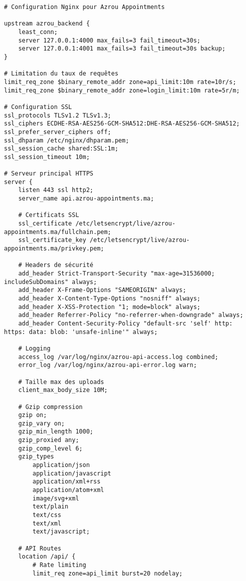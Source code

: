 \begin{lstlisting}[caption=nginx.conf - Configuration Nginx complète]
# Configuration Nginx pour Azrou Appointments

upstream azrou_backend {
    least_conn;
    server 127.0.0.1:4000 max_fails=3 fail_timeout=30s;
    server 127.0.0.1:4001 max_fails=3 fail_timeout=30s backup;
}

# Limitation du taux de requêtes
limit_req_zone $binary_remote_addr zone=api_limit:10m rate=10r/s;
limit_req_zone $binary_remote_addr zone=login_limit:10m rate=5r/m;

# Configuration SSL
ssl_protocols TLSv1.2 TLSv1.3;
ssl_ciphers ECDHE-RSA-AES256-GCM-SHA512:DHE-RSA-AES256-GCM-SHA512;
ssl_prefer_server_ciphers off;
ssl_dhparam /etc/nginx/dhparam.pem;
ssl_session_cache shared:SSL:1m;
ssl_session_timeout 10m;

# Serveur principal HTTPS
server {
    listen 443 ssl http2;
    server_name api.azrou-appointments.ma;
    
    # Certificats SSL
    ssl_certificate /etc/letsencrypt/live/azrou-appointments.ma/fullchain.pem;
    ssl_certificate_key /etc/letsencrypt/live/azrou-appointments.ma/privkey.pem;
    
    # Headers de sécurité
    add_header Strict-Transport-Security "max-age=31536000; includeSubDomains" always;
    add_header X-Frame-Options "SAMEORIGIN" always;
    add_header X-Content-Type-Options "nosniff" always;
    add_header X-XSS-Protection "1; mode=block" always;
    add_header Referrer-Policy "no-referrer-when-downgrade" always;
    add_header Content-Security-Policy "default-src 'self' http: https: data: blob: 'unsafe-inline'" always;
    
    # Logging
    access_log /var/log/nginx/azrou-api-access.log combined;
    error_log /var/log/nginx/azrou-api-error.log warn;
    
    # Taille max des uploads
    client_max_body_size 10M;
    
    # Gzip compression
    gzip on;
    gzip_vary on;
    gzip_min_length 1000;
    gzip_proxied any;
    gzip_comp_level 6;
    gzip_types
        application/json
        application/javascript
        application/xml+rss
        application/atom+xml
        image/svg+xml
        text/plain
        text/css
        text/xml
        text/javascript;
    
    # API Routes
    location /api/ {
        # Rate limiting
        limit_req zone=api_limit burst=20 nodelay;
        

\end{lstlisting}
